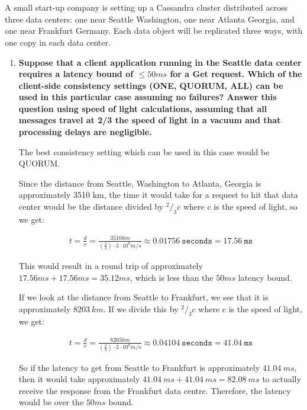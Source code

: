 \documentclass[12pt,a4paper]{article}
\newcommand*\rfrac[2]{{}^{#1}\!/_{#2}}
\begin{document}
\section{~}

A small start-up company is setting up a Cassandra cluster distributed across three data centers: one near Seattle Washington, one near Atlanta Georgia, and one near Frankfurt Germany. Each data object will be replicated three ways, with one copy in each data center.

\begin{enumerate}[label=(\alph*)]

\item \textbf{Suppose that a client application running in the Seattle data center requires a latency bound of $\leq50 ms$ for a Get request. Which of the client-side consistency settings (ONE, QUORUM, ALL) can be used in this particular case assuming no failures? Answer this question using speed of light calculations, assuming that all messages travel at 2/3 the speed of light in a vacuum and that processing delays are negligible.}

The best consistency setting which can be used in this case would be QUORUM. 

Since the distance from Seattle, Washington to Atlanta, Georgia is approximately 3510 km, the time it would take for a request to hit that data center would be the distance divided by $\rfrac{2}{3} c$ where c is the speed of light, so we get:

\begin{align*}
t = \frac{d}{v} = \frac{3510 km}{ \left(\frac{2}{3} \right) \cdot 3 \cdot 10^{8} m/s} \approx 0.01756\ \texttt{seconds} = 17.56\ \texttt{ms} 
\end{align*}

This would result in a round trip of approximately $17.56ms + 17.56ms=35.12ms$, which is less than the $50ms$ latency bound.

If we look at the distance from Seattle to Frankfurt, we see that it is approximately $8203\ km$. If we divide this by $\rfrac{2}{3} c$ where c is the speed of light, we get:

\begin{align*}
t = \frac{d}{v} = \frac{8203 km}{ \left(\frac{2}{3} \right) \cdot 3 \cdot 10^{8} m/s} \approx 0.04104\ \texttt{seconds} = 41.04\ \texttt{ms} 
\end{align*}

So if the latency to get from Seattle to Frankfurt is approximately $41.04\ ms$, then it would take approximately $41.04\ ms + 41.04\ ms =82.08\ ms$ to actually receive the response from the Frankfurt data centre. Therefore, the latency would be over the $50 ms$ bound. 


\end{enumerate}
\end{document}
